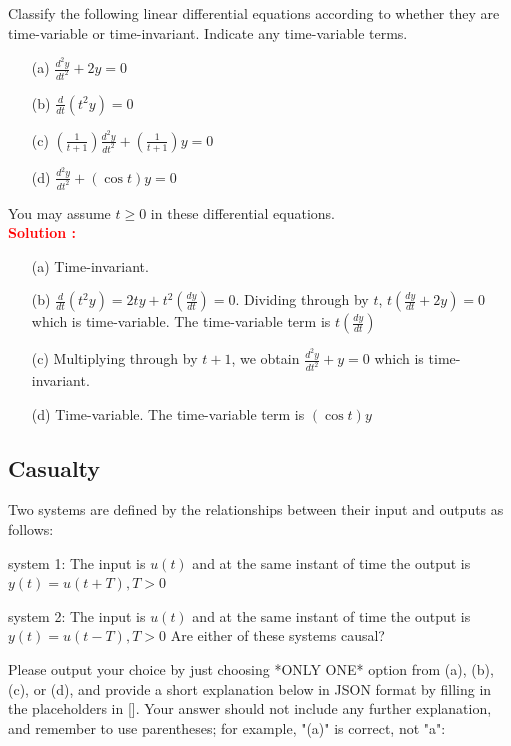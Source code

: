 \documentclass[12pt]{article}
\begin{document}
Classify the following linear differential equations according to whether they are time-variable or time-invariant. Indicate any time-variable terms.
\begin{itemize}
    \item[(a)] \(\frac{d^2y}{dt^2} + 2y = 0\)
    \item[(b)] \(\frac{d}{dt}(t^2y) = 0 \)
    \item[(c)] \( \left( \frac{1}{t+1} \right) \frac{d^2y}{dt^2} + \left( \frac{1}{t+1} \right)y = 0 \)
    \item[(d)] \(\frac{d^2y}{dt^2} + (\cos t)y = 0 \)
\end{itemize}
You may assume \(t\geq0\) in these differential equations.\\
\textbf{\textcolor{red}{Solution :}} \\
\begin{itemize}
    \item[(a)] Time-invariant.
    \item[(b)] \(\frac{d}{dt}(t^2y) = 2ty + t^2 \left( \frac{dy}{dt} \right) = 0 \). Dividing through by \(t\), \(t\left(\frac{dy}{dt} + 2y \right) = 0\) which is time-variable. The time-variable term is \(t\left( \frac{dy}{dt} \right)\)
    \item[(c)] Multiplying through by \(t+1\), we obtain \(\frac{d^2y}{dt^2} + y = 0\) which is time-invariant.
    \item[(d)] Time-variable. The time-variable term is \((\cos t) y\)
\end{itemize}


\clearpage
\subsection{Casualty}

Two systems are defined by the relationships between their input and outputs as follows:

system 1: The input is \(u(t)\) and at the same instant of time the output is \(y(t) = u(t+T), T>0\)

system 2: The input is \(u(t)\) and at the same instant of time the output is \(y(t) = u(t-T), T>0\)
Are either of these systems causal?


Please output your choice by just choosing *ONLY ONE* option from (a), (b), (c), or (d), and provide a short explanation below in JSON format by filling in the placeholders in []. Your answer should not include any further explanation, and remember to use parentheses; for example, "(a)" is correct, not "a":
\end{document}
